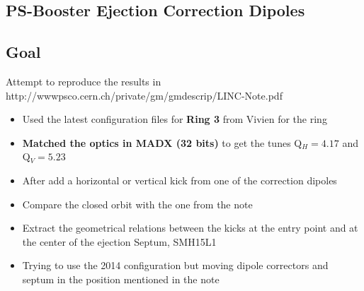 \documentclass[11pt,letter,english]{article}
\begin{document}
\nocite{*} 

\small
\newcommand*{\data}{\ifcase\month\or
  January\or February\or March\or April\or May\or June\or
  July\or August\or September\or October\or November\or December\fi
  \space\number\day th,\space\number\year}
\newcommand{\blue}    {\color[named]{Blue}}
\newcommand{\black}   {\color[named]{Black}}
\newcommand{\red}     {\color[named]{Red}}
\newcommand{\green}   {\color[named]{Green}}
\newcommand{\orange}  {\color[named]{Orange}}
\newcommand{\yellow}  {\color[named]{Yellow}}
\newcommand{\magenta} {\color[named]{Magenta}}
\newcommand{\cyan}    {\color[named]{Cyan}}

\def\CP{{\sffamily CP}}

\begin{center}
 \section*{\huge{PS-Booster Ejection Correction Dipoles}} 
 \vspace {0.6cm}
\end{center}

\subsection*{Goal}

Attempt to reproduce the results in http://wwwpsco.cern.ch/private/gm/gmdescrip/LINC-Note.pdf

\begin{itemize}
\item{Used the latest configuration files for {\bf Ring 3} from Vivien for the ring}
\item{{\bf Matched the optics in MADX (32 bits)} to get the tunes Q$_H=4.17$ and Q$_V=5.23$}
\item{After add a horizontal or vertical kick from one of the correction dipoles}
\item{Compare the closed orbit with the one from the note}
\item{Extract the geometrical relations between the kicks at the entry point and at the center of the ejection Septum, SMH15L1}
\item{Trying to use the 2014 configuration but moving dipole correctors and septum in the position mentioned in the note}
\end{itemize}
\end{document}
